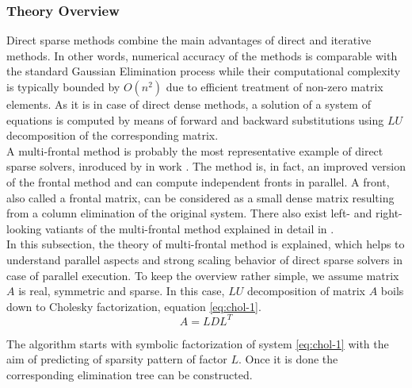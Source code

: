 \subsubsection{Theory Overview}
\label{subseq:direct-sparse methods}

Direct sparse methods combine the main advantages of direct and iterative methods. In other words, numerical accuracy of the methods is comparable with the standard Gaussian Elimination process while their computational complexity is typically bounded by $O(n^2)$ \cite{complexity-of-spdm} due to efficient treatment of non-zero matrix elements. As it is in case of direct dense methods, a solution of a system of equations is computed by means of forward and backward substitutions using $LU$ decomposition of the corresponding matrix.\\


A multi-frontal method is probably the most representative example of direct sparse solvers, inroduced by \citeauthor{mult-frontal-original:1} in work \cite{mult-frontal-original:1}. The method is, in fact, an improved version of the frontal method \cite{frontal-original} and can compute independent fronts in parallel. A front, also called a frontal matrix, can be considered as a small dense matrix resulting from a column elimination of the original system. There also exist left- and right-looking vatiants of the multi-frontal method explained in detail in \cite{elimination-tree}.\\


In this subsection, the theory of multi-frontal method is explained, which helps to understand parallel aspects and strong scaling behavior of   direct sparse solvers in case of parallel execution. To keep the overview rather simple, we assume matrix $A$ is real, symmetric and sparse. In this case, $LU$ decomposition of matrix $A$ boils down to Cholesky factorization, equation \ref{eq:chol-1}.\\

\begin{equation} \label{eq:chol-1}
	A = LDL^T
\end{equation}

The algorithm starts with symbolic factorization of system \ref{eq:chol-1} with the aim of predicting of sparsity pattern of factor $L$. Once it is done the corresponding elimination tree can be constructed.\\

\figpointer{\ref{fig:sparsity-pattern-example-mm}}

